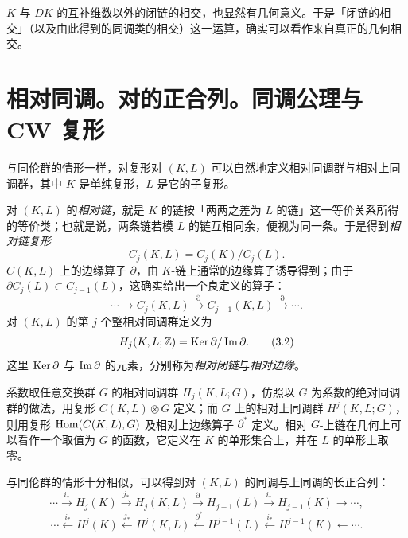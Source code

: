 $K$ 与 $DK$ 的互补维数以外的闭链的相交，也显然有几何意义。于是「闭链的相交」（以及由此得到的同调类的相交）这一运算，确实可以看作来自真正的几何相交。

\section{相对同调。对的正合列。同调公理与 CW 复形}

与同伦群的情形一样，对复形对 $(K,L)$ 可以自然地定义相对同调群与相对上同调群，其中 $K$ 是单纯复形，$L$ 是它的子复形。

对 $(K,L)$ 的\emph{相对链}，就是 $K$ 的链按「两两之差为 $L$ 的链」这一等价关系所得的等价类；也就是说，两条链若模 $L$ 的链互相同余，便视为同一条。于是得到\emph{相对链复形}
\begin{equation}
  C_j(K,L)=C_j(K)/C_j(L). \tag{3.1}
\end{equation}
$C(K,L)$ 上的边缘算子 $\partial$，由 $K$-链上通常的边缘算子诱导得到；由于 $\partial C_j(L)\subset C_{j-1}(L)$，这确实给出一个良定义的算子：
\[
  \cdots\to C_j(K,L)\xrightarrow{\partial}C_{j-1}(K,L)\xrightarrow{\partial}\cdots .
\]
对 $(K,L)$ 的第 $j$ 个整相对同调群定义为
\begin{equation}
  H_j(K,L;\mathbb{Z})=\operatorname{Ker}\partial/\operatorname{Im}\partial. \tag{3.2}
\end{equation}
这里 $\operatorname{Ker}\partial$ 与 $\operatorname{Im}\partial$ 的元素，分别称为\emph{相对闭链}与\emph{相对边缘}。

系数取任意交换群 $G$ 的相对同调群 $H_j(K,L;G)$，仿照以 $G$ 为系数的绝对同调群的做法，用复形 $C(K,L)\otimes G$ 定义；而 $G$ 上的相对上同调群 $H^j(K,L;G)$，则用复形 $\operatorname{Hom}(C(K,L),G)$ 及相对上边缘算子 $\partial^*$ 定义。相对 $G$-上链在几何上可以看作一个取值为 $G$ 的函数，它定义在 $K$ 的单形集合上，并在 $L$ 的单形上取零。

与同伦群的情形十分相似，可以得到对 $(K,L)$ 的同调与上同调的长正合列：
\begin{equation}
  \cdots\xrightarrow{i_*}H_j(K)\xrightarrow{j_*}H_j(K,L)\xrightarrow{\partial}
  H_{j-1}(L)\xrightarrow{i_*}H_{j-1}(K)\to\cdots, \tag{3.3}
\end{equation}
\begin{equation}
  \cdots\xleftarrow{i_*}H^j(K)\xleftarrow{j_*}H^j(K,L)\xleftarrow{\partial^*}
  H^{j-1}(L)\xleftarrow{i_*}H^{j-1}(K)\leftarrow\cdots . \tag{3.4}
\end{equation}

